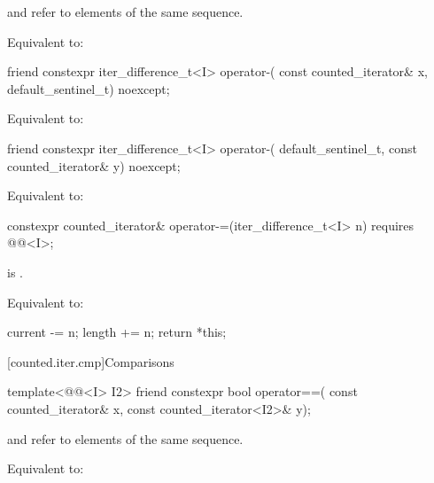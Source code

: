 \begin{itemdescr}
\pnum
\expects
{} and  refer to elements of the same
sequence.

\pnum
\effects
Equivalent to: 
\end{itemdescr}

%
\begin{itemdecl}
friend constexpr iter_difference_t<I> operator-(
  const counted_iterator& x, default_sentinel_t) noexcept;
\end{itemdecl}

\begin{itemdescr}
\pnum
\effects
Equivalent to:
\end{itemdescr}

%
\begin{itemdecl}
friend constexpr iter_difference_t<I> operator-(
  default_sentinel_t, const counted_iterator& y) noexcept;
\end{itemdecl}

\begin{itemdescr}
\pnum
\effects
Equivalent to: 
\end{itemdescr}

%
\begin{itemdecl}
constexpr counted_iterator& operator-=(iter_difference_t<I> n)
  requires @@<I>;
\end{itemdecl}

\begin{itemdescr}
\pnum
\hardexpects
{} is .

\pnum
\effects
Equivalent to:
\begin{codeblock}
current -= n;
length += n;
return *this;
\end{codeblock}
\end{itemdescr}

[counted.iter.cmp]{Comparisons}

%
\begin{itemdecl}
template<@@<I> I2>
  friend constexpr bool operator==(
    const counted_iterator& x, const counted_iterator<I2>& y);
\end{itemdecl}

\begin{itemdescr}
\pnum
\expects
{} and  refer to
elements of the same sequence.

\pnum
\effects
Equivalent to: 
\end{itemdescr}

